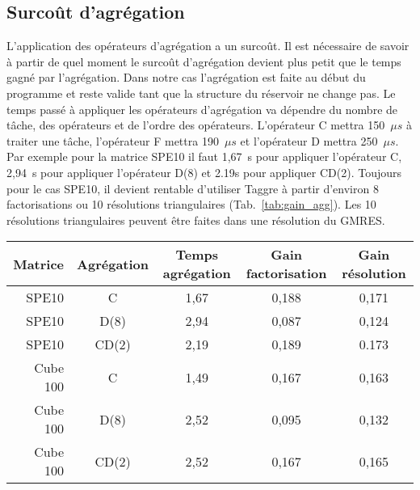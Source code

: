 \subsection{Surcoût d'agrégation}
L'application des opérateurs d'agrégation a un surcoût.
%
Il est nécessaire de savoir à partir de quel moment le surcoût d'agrégation devient plus petit que le temps gagné par l'agrégation.
%
Dans notre cas l'agrégation est faite au début du programme et reste valide tant que la structure du réservoir ne change pas.
%
Le temps passé à appliquer les opérateurs d'agrégation va dépendre du nombre de tâche, des opérateurs et de l'ordre des opérateurs.
%
L'opérateur C mettra 150~$\mu{s}$ à traiter une tâche, l'opérateur F mettra 190~$\mu{s}$ et l'opérateur D mettra 250~$\mu{s}$.
%
Par exemple pour la matrice SPE10 il faut 1,67~s pour appliquer l'opérateur C, 2,94~s pour appliquer l'opérateur D(8) et 2.19s pour appliquer CD(2).
%
Toujours pour le cas SPE10, il devient rentable d'utiliser Taggre à partir d'environ 8 factorisations ou 10 résolutions triangulaires (Tab.~\ref{tab:gain_agg}).
%
Les 10 résolutions triangulaires peuvent être faites dans une résolution du GMRES.

\begin{center}
  \begin{tabular}{ | r | c || c | c | c | }
    \hline
    Matrice & Agrégation & Temps agrégation & Gain factorisation & Gain résolution \\
    \hline
    \hline
    SPE10   &      C     & 1,67          & 0,188          & 0,171 \\
    \hline
    SPE10   &    D(8)    & 2,94          & 0,087          & 0,124 \\
    \hline
    SPE10   &    CD(2)   & 2,19          & 0,189          & 0.173 \\
    \hline
    \hline
    Cube 100&      C     & 1,49          & 0,167          & 0,163 \\
    \hline
    Cube 100&    D(8)    & 2,52          & 0,095          & 0,132 \\
    \hline
    Cube 100&    CD(2)   & 2,52          & 0,167          & 0,165 \\
    \hline
  \end{tabular}
  \label{tab:gain_agg}
\end{center}
